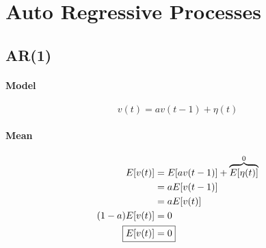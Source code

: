 \documentclass{article}
\begin{document}
\section{Auto Regressive Processes}
\subsection{AR(1)}
\paragraph{Model}
\[v(t)=av(t-1)+\eta(t)\]
\paragraph{Mean}
\begin{alignat*}{2}
E[v(t)]&=E[av(t-1)]+\overbrace{E[\eta(t)]}^0\\
&=aE[v(t-1)]\\
&=aE[v(t)]\\
(1-a)E[v(t)]&=0\\
\Aboxed{
E[v(t)]&=0
}
\end{alignat*}
\end{document}
